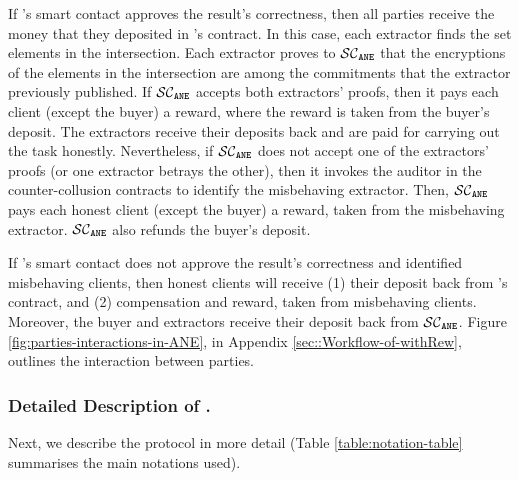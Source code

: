 If  \fpsi's smart contact approves the result's correctness, then all parties receive the money that they deposited in \fpsi's contract. In this case, each extractor finds the set elements in the intersection. Each extractor proves to $\mathcal{SC}_{\mathtt{ANE}}$ that the encryptions of the elements in the intersection are among the commitments that the extractor previously published. 
%
If $\mathcal{SC}_{\mathtt{ANE}}$ accepts both extractors' proofs, then it pays each client (except the buyer) a reward, where the reward is taken from the buyer's deposit. The extractors receive their deposits back and are paid for carrying out the task honestly. Nevertheless, if $\mathcal{SC}_{\mathtt{ANE}}$ does not accept one of the extractors' proofs (or one extractor betrays the other), then it invokes the auditor in the counter-collusion contracts to identify the misbehaving extractor.  Then, $\mathcal{SC}_{\mathtt{ANE}}$ pays each honest client (except the buyer) a reward, taken from the misbehaving extractor. $\mathcal{SC}_{\mathtt{ANE}}$ also refunds the buyer's deposit.
%

If  \fpsi's smart contact does not approve the result's correctness and \aud identified misbehaving clients, then honest clients will receive (1) their deposit back from \fpsi's contract, and (2)  compensation and reward, taken from misbehaving clients. Moreover, the buyer and extractors receive their deposit back from $\mathcal{SC}_{\mathtt{ANE}}$. Figure \ref{fig:parties-interactions-in-ANE}, in Appendix \ref{sec::Workflow-of-withRew}, outlines the interaction between parties. 






\vs

\vs

\subsubsection{Detailed Description of \epsi.} Next, we describe the protocol in more detail (Table \ref{table:notation-table} summarises the main notations used). 




